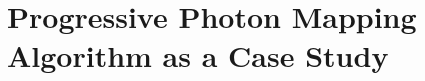 \documentclass[main.tex]{subfiles}
\begin{document}
\chapter{Progressive Photon Mapping Algorithm as a Case Study} \label{section:ppm}





\end{document}
